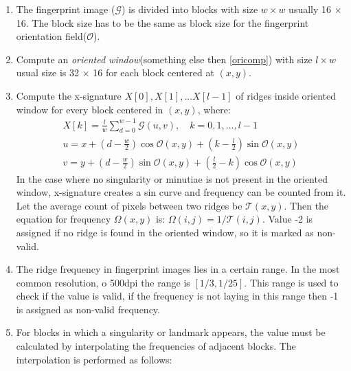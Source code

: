 \begin{enumerate}
    \item The fingerprint image ($\mathcal{G}$) is divided into blocks with size $w \times w$ usually 16 $\times$ 16. The block size has to be the same as block size for the fingerprint orientation field($\mathcal{O}$).\cite{hong1998fingerprint}
    
    \item Compute an \emph{oriented window}(something else then \ref{oricomp}) with size $l \times w$ usual size is 32 $\times$ 16 for each block centered at $(x, y)$.\cite{hong1998fingerprint}
    
    \item Compute the x-signature $X[0], X[1], ... X[l-1]$ of ridges inside oriented window for every block centered in $(x, y)$, where:
    \begin{align}
    X[k]=\frac{l}{w} \sum_{d=0}^{w-1} \mathcal{G}(u, v), \quad k=0,1, \ldots, l-1 \\
    u=x+\left(d-\frac{w}{2}\right) \cos \mathcal{O}(x, y)+\left(k-\frac{l}{2}\right) \sin \mathcal{O}(x, y)\\
    v=y+\left(d-\frac{w}{2}\right) \sin \mathcal{O}(x, y)+\left(\frac{l}{2}-k\right) \cos \mathcal{O}(x, y)
    \end{align}
	In the case where no singularity or minutiae is not present in the oriented window, x-signature creates a sin curve and frequency can be counted from it. Let the average count of pixels between two ridges be $\mathcal{T}(x, y)$. Then the equation for frequency $\Omega(x, y)$ is: $\Omega(i, j)=1 / \mathcal{T}(i, j)$. Value -2 is assigned if no ridge is found in the oriented window, so it is marked as non-valid.\cite{hong1998fingerprint}
    
    \item The ridge frequency in fingerprint images lies in a certain range. In the most common resolution, o 500dpi the range is $[ 1/3, 1/25]$. This range is used to check if the value is valid, if the frequency is not laying in this range then -1 is assigned as non-valid frequency.\cite{hong1998fingerprint}
    
    \item For blocks in which a singularity or landmark appears, the value must be calculated by interpolating the frequencies of adjacent blocks. The interpolation is performed as follows:\cite{hong1998fingerprint}
    

\end{enumerate}
